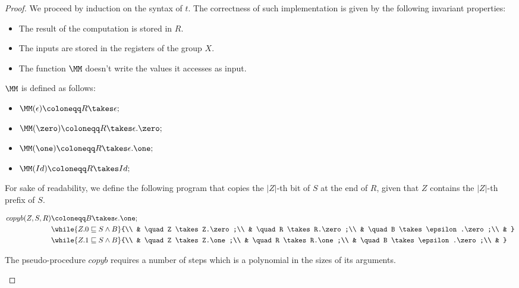 \begin{proof}
We proceed by induction on the syntax of $t$. The correctness of such implementation is given by the following invariant properties:
\begin{itemize}
\item The result of the computation is stored in $R$.
\item The inputs are stored in the registers of the group $X$.
\item The function $\MM$ doesn't write the values it accesses as input.
\end{itemize}

$\MM$ is defined as follows:
\begin{itemize}
\item $\MM(\epsilon)\coloneqq R \takes \epsilon ;$
\item $\MM(\zero)\coloneqq R \takes \epsilon.\zero ;$
\item $\MM(\one)\coloneqq R \takes \epsilon.\one ;$
\item $\MM(Id)\coloneqq R \takes Id ;$
\end{itemize}

For sake of readability, we define the following program that copies the $|Z|$-th bit of $S$ at the end of $R$, given that $Z$ contains the $|Z|$-th prefix of $S$.

\begin{align*}
copyb (Z, S, R)&\coloneqq B \takes \epsilon.\one;\\
& \while{Z.0 \sqsubseteq S\land B}{\\
& \quad Z \takes Z.\zero;\\
& \quad R \takes R.\zero;\\
& \quad B \takes \epsilon.\zero;\\
& }\\
& \while{Z.1 \sqsubseteq S\land B}{\\
& \quad Z \takes Z.\one;\\
& \quad R \takes R.\one;\\
& \quad B \takes \epsilon.\zero;\\
& }\\
\end{align*}

\begin{lemma}
\label{lemma:compcopyb}
The pseudo-procedure $copyb$ requires a number of steps which is a polynomial in the sizes of its arguments.
\end{lemma}


\end{proof}
